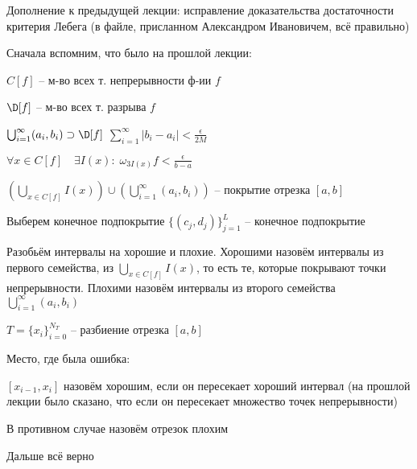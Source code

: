 \newpage

\begin{remark} Дополнение к предыдущей лекции: исправление доказательства достаточности критерия Лебега (в файле, присланном Александром Ивановичем, всё правильно)

Сначала вспомним, что было на прошлой лекции:

$C[f]$ -- м-во всех т. непрерывности ф-ии $f$

$\D[f]$ -- м-во всех т. разрыва $f$

$\bigcup_{i=1}^{\infty}(a_i, b_i) \supset \D[f]$
\hfill
$\sum_{i=1}^{\infty} |b_i - a_i| < \frac{\epsilon}{2M}$

$\forall x \in C[f]\quad \exists I(x):\; \omega_{3I(x)}f < \frac{\epsilon}{b - a}$

$\left(\bigcup_{x\in C[f]} I(x)\right) \cup \left(\bigcup_{i=1}^{\infty}(a_i,b_i)\right)$ -- покрытие отрезка $[a, b]$

Выберем конечное подпокрытие $\{(c_j, d_j)\}_{j=1}^L$ -- конечное подпокрытие

Разобьём интервалы на хорошие и плохие. Хорошими назовём интервалы из первого семейства, из $\bigcup_{x\in C[f]} I(x)$, то есть те, которые покрывают точки непрерывности. Плохими назовём интервалы из второго семейства $\bigcup_{i=1}^{\infty}(a_i,b_i)$

$T = \{x_i\}_{i=0}^{N_T}$ -- разбиение отрезка $[a, b]$

Место, где была ошибка:

$[x_{i-1}, x_i]$ назовём хорошим, если он пересекает хороший интервал (на прошлой лекции было сказано, что если он пересекает множество точек непрерывности)

В противном случае назовём отрезок плохим

Дальше всё верно
\end{remark}

